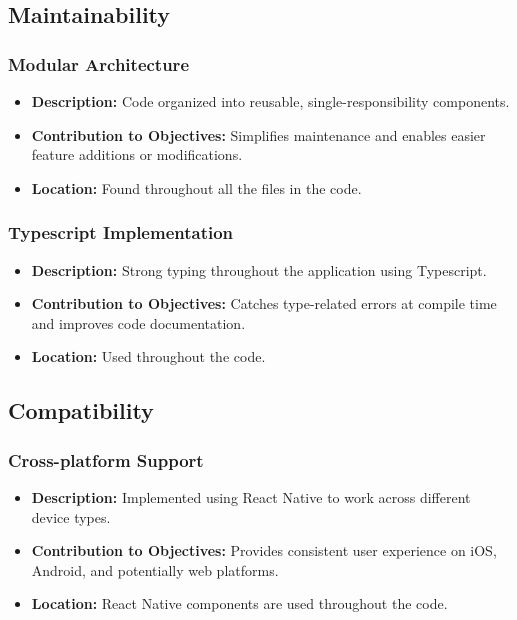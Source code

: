 \subsection{Maintainability}
\subsubsection{Modular Architecture}
\begin{itemize}
    \item \textbf{Description:} Code organized into reusable, single-responsibility components.
    \item \textbf{Contribution to Objectives:} Simplifies maintenance and enables easier feature additions or modifications.
    \item \textbf{Location:} Found throughout all the files in the code.
\end{itemize}

\subsubsection{Typescript Implementation}
\begin{itemize}
    \item \textbf{Description:} Strong typing throughout the application using Typescript.
    \item \textbf{Contribution to Objectives:} Catches type-related errors at compile time and improves code documentation.
    \item \textbf{Location:} Used throughout the code.
\end{itemize}

\subsection{Compatibility}
\subsubsection{Cross-platform Support}
\begin{itemize}
    \item \textbf{Description:} Implemented using React Native to work across different device types.
    \item \textbf{Contribution to Objectives:} Provides consistent user experience on iOS, Android, and potentially web platforms.
    \item \textbf{Location:} React Native components are used throughout the code.
\end{itemize}

